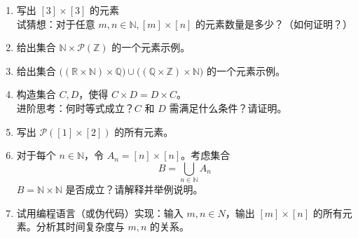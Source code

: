 \begin{enumerate}[label=(\arabic*)]
    \item 写出 $[3] \times [3]$ 的元素  \\
    试猜想：对于任意 $m, n \in \mathbb{N}, [m] \times [n]$ 的元素数量是多少？（如何证明？）
    \item 给出集合 $\mathbb{N} \times \mathcal{P}(\mathbb{Z})$ 的一个元素示例。
    \item 给出集合 $\big((\mathbb{R} \times \mathbb{N}) \times \mathbb{Q}\big) \cup \big((\mathbb{Q} \times \mathbb{Z}) \times \mathbb{N}\big)$ 的一个元素示例。
    \item 构造集合 $C, D$，使得 $C \times D = D \times C$。\\
    进阶思考：何时等式成立？$C$ 和 $D$ 需满足什么条件？请证明。
    \item 写出 $\mathcal{P}([1] \times [2])$ 的所有元素。
    \item 对于每个 $n \in \mathbb{N}$，令 $A_n = [n] \times [n]$。考虑集合
    \[B = \bigcup_{n \in \mathbb{N}} A_n\]
    $B = \mathbb{N} \times \mathbb{N}$ 是否成立？请解释并举例说明。
    \item 试用编程语言（或伪代码）实现：输入 $m, n \in N$，输出 $[m] \times [n]$ 的所有元素。分析其时间复杂度与 $m,n$ 的关系。
\end{enumerate}